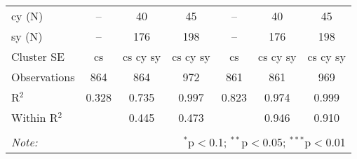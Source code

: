 \documentclass[a4paper]{article}
\begin{document}
\begin{table}[h!]
{\begin{tabular}[t]{lcccccc}
cy (N) & -- & 40 & 45 & -- & 40 & 45\\
sy (N) & -- & 176 & 198 & -- & 176 & 198\\
\midrule
Cluster SE & cs & cs cy sy & cs cy sy & cs & cs cy sy & cs cy sy\\
Observations & 864&864&972&861&861&969\\
R$^2$ & 0.328 & 0.735 & 0.997 & 0.823 &0.974 & 0.999 \\
Within R$^2$ & & 0.445 & 0.473 & & 0.946 & 0.910 \\ \bottomrule \\[-1em]
\textit{Note:}  & \multicolumn{6}{r}{$^{*}$p$<$0.1; $^{**}$p$<$0.05; $^{***}$p$<$0.01} \\ 
\end{tabular}
}
\end{table}
\FloatBarrier
\end{document}

